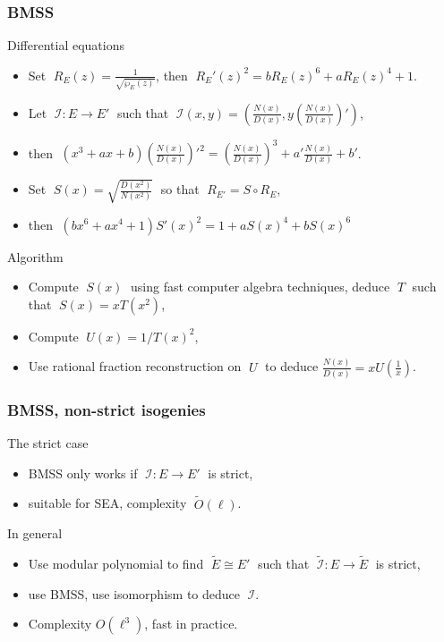 \documentclass[10pt]{beamer}
\newcommand{\isom}{\cong}  %
\newcommand{\0}{\mathcal{O}}  %
\newcommand{\isog}[1]{\mathcal{#1}}  %
\newcommand{\I}{\isog{I}}  %
\newcommand{\tildO}{\tilde{O}}  %
\begin{document}
\begin{frame}
  \frametitle{BMSS}

  \begin{block}{Differential equations}
    \begin{itemize}
    \item Set $\;R_E(z) = \frac{1}{\sqrt{\wp_E(z)}}$, then $\;R_E'(z)^2 =
      b R_E(z)^6 + a R_E(z)^4 + 1$.
    \item Let $\;\I:E\rightarrow E'\;$ such that \alert<2>{$\;\I(x,y) =
      \left(\frac{N(x)}{D(x)},
        y\left(\frac{N(x)}{D(x)}\right)'\right)$},
    \item then $\;(x^3 + ax + b)\left(\frac{N(x)}{D(x)}\right)'^2 =
      \left(\frac{N(x)}{D(x)}\right)^3 + a'\frac{N(x)}{D(x)} + b'$.
    \item Set $\;S(x) = \sqrt{\frac{D(x^2)}{N(x^2)}}\;$ so that $\;R_{E'} =
      S\circ R_E$,
    \item then $\;(bx^6 + ax^4 + 1)S'(x)^2 = 1 + aS(x)^4 + bS(x)^6$
    \end{itemize}
  \end{block}

  \begin{block}{Algorithm}
    \begin{itemize}
    \item Compute $\;S(x)\;$ using fast computer algebra techniques,
      deduce $\;T\;$ such that $\;S(x) = xT(x^2)$,
    \item Compute $\;U(x) = 1/T(x)^2$,
    \item Use rational fraction reconstruction on $\;U\;$ to deduce
      $\frac{N(x)}{D(x)} = xU\left(\frac{1}{x}\right)$.
    \end{itemize}
  \end{block}
\end{frame}


\begin{frame}
  \frametitle{BMSS, non-strict isogenies}
  
  \begin{block}{The strict case}
    \begin{itemize}
    \item BMSS only works if $\;\I:E\rightarrow E'\;$ is strict,
    \item suitable for SEA, complexity $\;\tildO(\ell)$.
    \end{itemize}
  \end{block}

  \begin{block}{In general}
    \begin{itemize}
    \item Use modular polynomial to find $\;\tilde{E}\isom E'\;$ such
      that $\;\tilde{\I}:E\rightarrow\tilde{E}\;$ is strict,
    \item use BMSS, use isomorphism to deduce $\;\I$.
    \item Complexity $O(\ell^3)$, fast in practice.
    \end{itemize}
  \end{block}
\end{frame}
\end{document}
